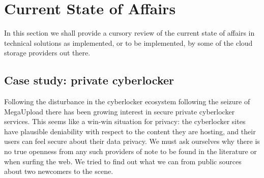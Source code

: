 \documentclass[11pt]{article}
\begin{document}



\section{Current State of Affairs}
\label{sec:technical_analysis}




In this section we shall provide a cursory review of the current state of affairs in technical solutions as implemented, or to be implemented, by some of the cloud storage providers out there.

\subsection{Case study: private cyberlocker}
\label{sec:cyberlocker}
%
Following the disturbance in the cyberlocker ecosystem following the seizure of MegaUpload there has been growing interest in secure private cyberlocker services.
This seems like a win-win situation for privacy: the cyberlocker sites have plausible deniability with respect to the content they are hosting, and their users can feel secure about their data privacy.
We must ask ourselves why there is no true openness from any such providers of note to be found in the literature or when surfing the web. \cite{borgmann2012security}
We tried to find out what we can from public sources about two newcomers to the scene.
\end{document}
